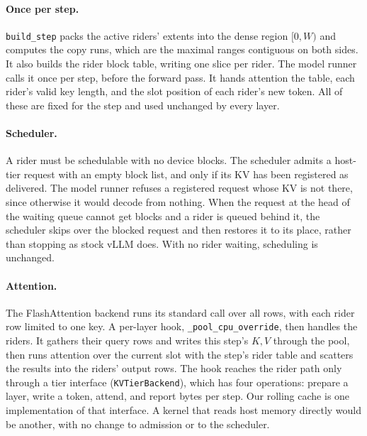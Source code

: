 \paragraph{Once per step.} \texttt{build\_step} packs the active riders' extents
into the dense region $[0,W)$ and computes the copy runs, which are the
maximal ranges contiguous on both sides. It also builds the rider block table,
writing one slice per rider. The model runner calls it once per step, before
the forward pass. It hands attention the table, each rider's valid key length,
and the slot position of each rider's new token. All of these are fixed for
the step and used unchanged by every layer.

\paragraph{Scheduler.} A rider must be schedulable with no device blocks. The
scheduler admits a host-tier request with an empty block list, and only if its
KV has been registered as delivered. The model runner refuses a registered
request whose KV is not there, since otherwise it would decode from nothing.
When the request at the head of the waiting queue cannot get blocks and a
rider is queued behind it, the scheduler skips over the blocked request and
then restores it to its place, rather than stopping as stock vLLM does. With
no rider waiting, scheduling is unchanged.

\paragraph{Attention.} The FlashAttention backend runs its standard call over
all rows, with each rider row limited to one key. A per-layer hook,
\texttt{\_pool\_cpu\_override}, then handles the riders. It gathers their
query rows and writes this step's $K,V$ through the pool, then runs attention
over the current slot with the step's rider table and scatters the results
into the riders' output rows. The hook reaches the rider path only through a
tier interface (\texttt{KVTierBackend}), which has four operations: prepare a
layer, write a token, attend, and report bytes per step. Our rolling cache is
one implementation of that interface. A kernel that reads host memory directly
would be another, with no change to admission or to the scheduler.

